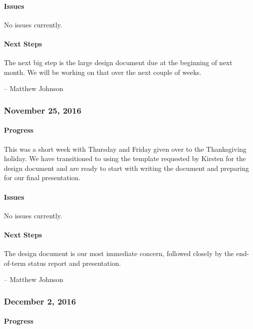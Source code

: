 \documentclass[10pt,onecolumn,journal,draftclsnofoot]{IEEEtran}
\begin{document}
\paragraph{Issues} 

No issues currently.

\paragraph{Next Steps} 

The next big step is the large design document due at the beginning of
next month. We will be working on that over the next couple of weeks.

-- Matthew Johnson

\subsubsection{November 25, 2016} 

\paragraph{Progress} 

This was a short week with Thursday and Friday given over to the
Thanksgiving holiday. We have transitioned to using the template
requested by Kirsten for the design document and are ready to start with
writing the document and preparing for our final presentation.

\paragraph{Issues} 

No issues currently.

\paragraph{Next Steps} 

The design document is our most immediate concern, followed closely by
the end-of-term status report and presentation.

-- Matthew Johnson

\subsubsection{December 2, 2016} 

\paragraph{Progress} 
\end{document}
